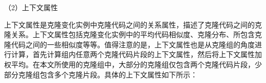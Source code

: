 
（2）上下文属性

上下文属性是克隆变化实例中克隆代码之间的关系属性，描述了克隆代码之间的克隆关系。上下文属性包括克隆变化实例中的平均代码相似度、克隆分布、所包含克隆代码之间的一些相似度等等。值得注意的是，上下文属性也是从克隆组的角度进行计算，首先计算组内任意两个克隆代码片段的上下文属性，然后将上下文属性加权平均。在本文所使用的克隆组中，大部分的克隆组仅包含两个克隆代码片段，少部分克隆组包含多个克隆片段。具体的上下文属性如下所示：


